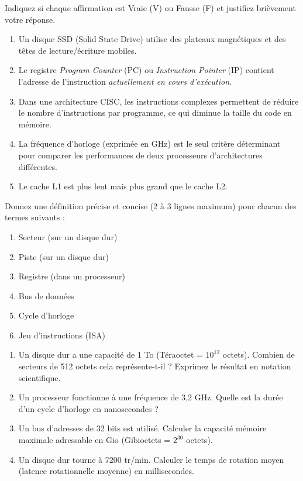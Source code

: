 \documentclass[11pt]{article}
\begin{document}
\begin{exercice}
Indiquez si chaque affirmation est Vraie (V) ou Fausse (F) et justifiez brièvement votre réponse.
\begin{enumerate}
    \item Un disque SSD (Solid State Drive) utilise des plateaux magnétiques et des têtes de lecture/écriture mobiles.
    \item Le registre \emph{Program Counter} (PC) ou \emph{Instruction Pointer} (IP) contient l'adresse de l'instruction \emph{actuellement en cours d'exécution}.
    \item Dans une architecture CISC, les instructions complexes permettent de réduire le nombre d'instructions par programme, ce qui diminue la taille du code en mémoire.
    \item La fréquence d'horloge (exprimée en GHz) est le seul critère déterminant pour comparer les performances de deux processeurs d'architectures différentes.
    \item Le cache L1 est plus lent mais plus grand que le cache L2.
\end{enumerate}
\end{exercice}

\begin{exercice}
Donnez une définition précise et concise (2 à 3 lignes maximum) pour chacun des termes suivants :
\begin{enumerate}
    \item Secteur (sur un disque dur)
    \item Piste (sur un disque dur)
    \item Registre (dans un processeur)
    \item Bus de données
    \item Cycle d'horloge
    \item Jeu d'instructions (ISA)
\end{enumerate}
\end{exercice}

\begin{exercice}
\begin{enumerate}
    \item Un disque dur a une capacité de 1 To (Téraoctet = $10^{12}$ octets). Combien de secteurs de 512 octets cela représente-t-il ? Exprimez le résultat en notation scientifique.
    \item Un processeur fonctionne à une fréquence de 3,2 GHz. Quelle est la durée d'un cycle d'horloge en nanosecondes ?
    \item Un bus d'adresses de 32 bits est utilisé. Calculer la capacité mémoire maximale adressable en Gio (Gibioctets = $2^{30}$ octets).
    \item Un disque dur tourne à 7200 tr/min. Calculer le temps de rotation moyen (latence rotationnelle moyenne) en millisecondes.
\end{enumerate}
\end{exercice}
\end{document}
